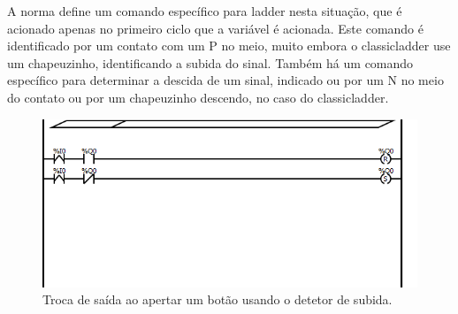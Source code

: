 A norma define um comando específico para ladder nesta situação, que é acionado apenas no primeiro ciclo que a variável é acionada. Este comando é identificado por um contato com um P no meio, muito embora o classicladder use um chapeuzinho, identificando a subida do sinal. Também há um comando específico para determinar a descida de um sinal, indicado ou por um N no meio do contato ou por um chapeuzinho descendo, no caso do classicladder.

\begin{figure}[hbt]
	\centering
	\includegraphics[width=\textwidth]{figuras/pulso2}
	\caption{Troca de saída ao apertar um botão usando o detetor de subida.}
	\label{fig:ladder_pulso2}
\end{figure}
